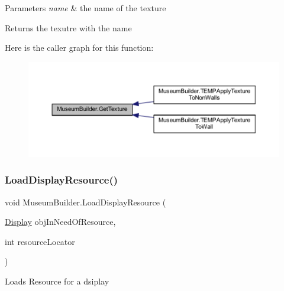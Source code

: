 \begin{DoxyParams}{Parameters}
{\em name} & the name of the texture\\
\hline
\end{DoxyParams}
\begin{DoxyReturn}{Returns}
the texutre with the name
\end{DoxyReturn}
Here is the caller graph for this function\+:
\nopagebreak
\begin{figure}[H]
\begin{center}
\leavevmode
\includegraphics[width=350pt]{class_museum_builder_ab416edbde4d42e80e0d27a29ea4595bd_icgraph}
\end{center}
\end{figure}
\mbox{\label{class_museum_builder_a09f7bfa34308891e3a2bf306c2b0d5e2}} 
\subsubsection{\texorpdfstring{Load\+Display\+Resource()}{LoadDisplayResource()}}
{\footnotesize\ttfamily void Museum\+Builder.\+Load\+Display\+Resource (\begin{DoxyParamCaption}\item[{\mbox{\hyperlink{class_display}{Display}}}]{obj\+In\+Need\+Of\+Resource,  }\item[{int}]{resource\+Locator }\end{DoxyParamCaption})\hspace{0.3cm}{\ttfamily [private]}}



Loads Resource for a dsiplay 

